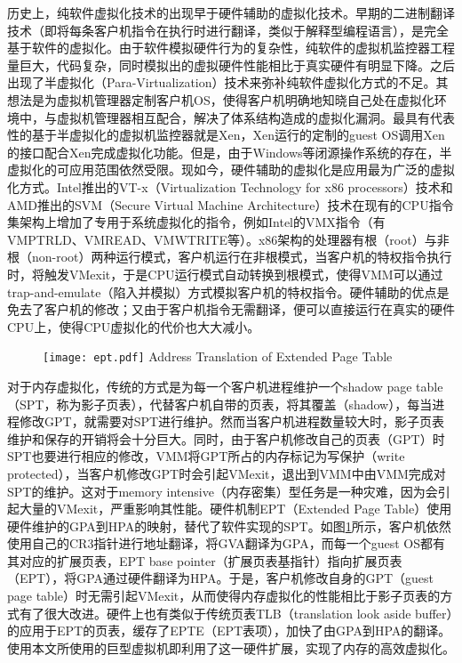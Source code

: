 历史上，纯软件虚拟化技术的出现早于硬件辅助的虚拟化技术。早期的二进制翻译技术（即将每条客户机指令在执行时进行翻译，类似于解释型编程语言），是完全基于软件的虚拟化。由于软件模拟硬件行为的复杂性，纯软件的虚拟机监控器工程量巨大，代码复杂，同时模拟出的虚拟硬件性能相比于真实硬件有明显下降。之后出现了半虚拟化（Para-Virtualization）技术来弥补纯软件虚拟化方式的不足。其想法是为虚拟机管理器定制客户机OS，使得客户机明确地知晓自己处在虚拟化环境中，与虚拟机管理器相互配合，解决了体系结构造成的虚拟化漏洞。最具有代表性的基于半虚拟化的虚拟机监控器就是Xen\cite{artofxen}，Xen运行的定制的guest OS调用Xen的接口配合Xen完成虚拟化功能。但是，由于Windows等闭源操作系统的存在，半虚拟化的可应用范围依然受限。现如今，硬件辅助的虚拟化是应用最为广泛的虚拟化方式。Intel推出的VT-x（Virtualization Technology for x86 processors）技术\cite{intelv}和AMD推出的SVM（Secure Virtual Machine Architecture）技术\cite{amdv}在现有的CPU指令集架构上增加了专用于系统虚拟化的指令，例如Intel的VMX指令（有VMPTRLD、VMREAD、VMWTRITE等）\cite{intelSDM}。x86架构的处理器有根（root）与非根（non-root）两种运行模式，客户机运行在非根模式，当客户机的特权指令执行时，将触发VMexit，于是CPU运行模式自动转换到根模式，使得VMM可以通过trap-and-emulate（陷入并模拟）方式模拟客户机的特权指令。硬件辅助的优点是免去了客户机的修改；又由于客户机指令无需翻译，便可以直接运行在真实的硬件CPU上，使得CPU虚拟化的代价也大大减小。

\begin{figure}[!htp]
  \centering
  \texttt{[image: ept.pdf]}
    {Address Translation of Extended Page Table}
  \label{fig:EPT}
\end{figure}
对于内存虚拟化，传统的方式是为每一个客户机进程维护一个shadow page table（SPT，称为影子页表），代替客户机自带的页表，将其覆盖（shadow），每当进程修改GPT，就需要对SPT进行维护。然而当客户机进程数量较大时，影子页表维护和保存的开销将会十分巨大。同时，由于客户机修改自己的页表（GPT）时SPT也要进行相应的修改，VMM将GPT所占的内存标记为写保护（write protected），当客户机修改GPT时会引起VMexit，退出到VMM中由VMM完成对SPT的维护。这对于memory intensive（内存密集）型任务是一种灾难，因为会引起大量的VMexit，严重影响其性能。硬件机制EPT（Extended Page Table）使用硬件维护的GPA到HPA的映射，替代了软件实现的SPT。如图\ref{fig:EPT}所示，客户机依然使用自己的CR3指针进行地址翻译，将GVA翻译为GPA，而每一个guest OS都有其对应的扩展页表，EPT base pointer（扩展页表基指针）指向扩展页表（EPT），将GPA通过硬件翻译为HPA。于是，客户机修改自身的GPT（guest page table）时无需引起VMexit，从而使得内存虚拟化的性能相比于影子页表的方式有了很大改进。硬件上也有类似于传统页表TLB（translation look aside buffer）的应用于EPT的页表，缓存了EPTE（EPT表项），加快了由GPA到HPA的翻译。使用本文所使用的巨型虚拟机即利用了这一硬件扩展，实现了内存的高效虚拟化。

